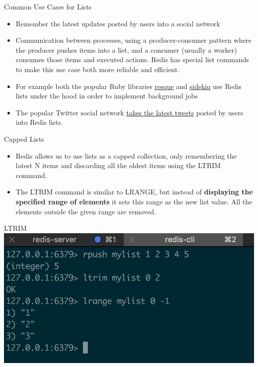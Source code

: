 \documentclass[10pt]{beamer}
\begin{document}
\begin{frame}[fragile]{Common Use Cases for Lists}
  \begin{itemize}
    \item Remember the latest updates posted by users into a social network
    \item Communication between processes, using a producer-consumer pattern
    where the producer pushes items into a list, and a consumer (usually a
    worker) consumes those items and executed actions. Redis has special list
    commands to make this use case both more reliable and efficient.
    \item For example both the popular Ruby libraries
    \href{https://github.com/resque/resque}{resque} and
    \href{https://github.com/mperham/sidekiq}{sidekiq} use Redis lists under
    the hood in order to implement background jobs
    \item The popular Twitter social network
    \href{https://www.infoq.com/presentations/Real-Time-Delivery-Twitter}{takes the latest tweets}
    posted by users into Redis lists.
  \end{itemize}
\end{frame}

\begin{frame}[fragile]{Capped Lists}
  \begin{itemize}
    \item Redis allows us to use lists as a capped collection, only remembering
    the latest N items and discarding all the oldest items using the LTRIM
    command.
    \item The LTRIM command is similar to LRANGE, but instead of \textbf{displaying
    the specified range of elements} it sets this range as the new list value.
    All the elements outside the given range are removed.
  \end{itemize}
\end{frame}

\begin{frame}[fragile]{LTRIM}
  \includegraphics[scale=0.9]{img/ltrim}
\end{frame}
\end{document}
